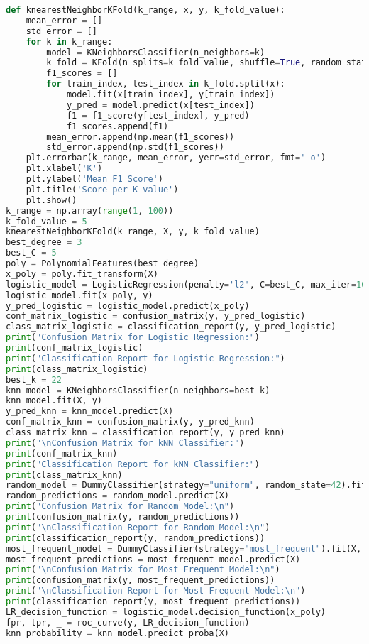 \documentclass[a4paper,10pt]{article}
\begin{document}
\begin{lstlisting}[language=Python, caption={}]
def knearestNeighborKFold(k_range, x, y, k_fold_value):
    mean_error = []
    std_error = []   
    for k in k_range:
        model = KNeighborsClassifier(n_neighbors=k)
        k_fold = KFold(n_splits=k_fold_value, shuffle=True, random_state=42)
        f1_scores = []
        for train_index, test_index in k_fold.split(x):        
            model.fit(x[train_index], y[train_index])
            y_pred = model.predict(x[test_index])
            f1 = f1_score(y[test_index], y_pred)
            f1_scores.append(f1)
        mean_error.append(np.mean(f1_scores))
        std_error.append(np.std(f1_scores))
    plt.errorbar(k_range, mean_error, yerr=std_error, fmt='-o')
    plt.xlabel('K')
    plt.ylabel('Mean F1 Score')
    plt.title('Score per K value')
    plt.show()
k_range = np.array(range(1, 100))
k_fold_value = 5
knearestNeighborKFold(k_range, X, y, k_fold_value)
best_degree = 3
best_C = 5
poly = PolynomialFeatures(best_degree)
x_poly = poly.fit_transform(X)
logistic_model = LogisticRegression(penalty='l2', C=best_C, max_iter=1000)
logistic_model.fit(x_poly, y)
y_pred_logistic = logistic_model.predict(x_poly)
conf_matrix_logistic = confusion_matrix(y, y_pred_logistic)
class_matrix_logistic = classification_report(y, y_pred_logistic)
print("Confusion Matrix for Logistic Regression:")
print(conf_matrix_logistic)
print("Classification Report for Logistic Regression:")
print(class_matrix_logistic)
best_k = 22
knn_model = KNeighborsClassifier(n_neighbors=best_k)
knn_model.fit(X, y)
y_pred_knn = knn_model.predict(X)
conf_matrix_knn = confusion_matrix(y, y_pred_knn)
class_matrix_knn = classification_report(y, y_pred_knn)
print("\nConfusion Matrix for kNN Classifier:")
print(conf_matrix_knn)
print("Classification Report for kNN Classifier:")
print(class_matrix_knn)
random_model = DummyClassifier(strategy="uniform", random_state=42).fit(X, y)
random_predictions = random_model.predict(X)
print("Confusion Matrix for Random Model:\n")
print(confusion_matrix(y, random_predictions))
print("\nClassification Report for Random Model:\n")
print(classification_report(y, random_predictions))
most_frequent_model = DummyClassifier(strategy="most_frequent").fit(X, y)
most_frequent_predictions = most_frequent_model.predict(X)
print("\nConfusion Matrix for Most Frequent Model:\n")
print(confusion_matrix(y, most_frequent_predictions))
print("\nClassification Report for Most Frequent Model:\n")
print(classification_report(y, most_frequent_predictions))
LR_decision_function = logistic_model.decision_function(x_poly)
fpr, tpr, _ = roc_curve(y, LR_decision_function)
knn_probability = knn_model.predict_proba(X)

\end{lstlisting}
\end{document}
